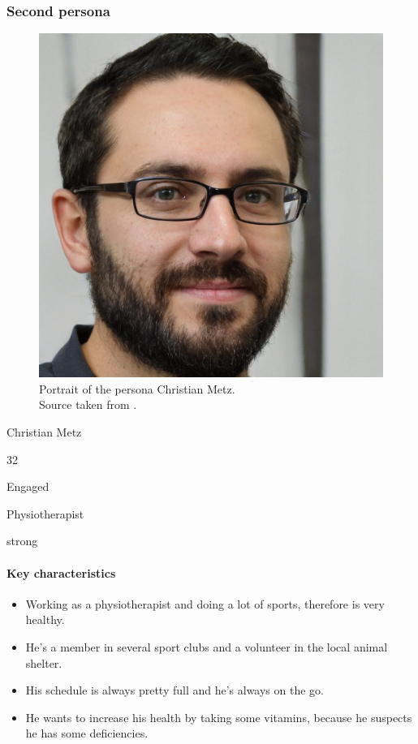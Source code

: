 \documentclass[conference]{IEEEtran}
\begin{document}
\subsubsection{Second persona} \hfill
\begin{figure}[h]
	\centerline{\includegraphics[width=.5\linewidth]{images/persona02.jpg}}
	\caption[Portrait of the persona Christian Metz; Source taken from \cite{personaimg}.]
	{Portrait of the persona Christian Metz.\\ Source taken from \cite{personaimg}.\endtabular}
	\label{fig:persona2}
\end{figure}

\begin{description}[labelwidth=\widthof{\bfseries Computer skills},leftmargin=.8cm,labelindent=.8cm]
	\item[Name] Christian Metz
	\item[Age] 32
	\item[Marital status] Engaged
	\item[Occupation] Physiotherapist
	\item[Computer skills] strong
\end{description}

\paragraph*{Key characteristics}
\begin{itemize}[leftmargin=1.25cm]
	\item Working as a physiotherapist and doing a lot of sports, therefore is very healthy.
	\item He's a member in several sport clubs and a volunteer in the local animal shelter.
	\item His schedule is always pretty full and he's always on the go.
	\item He wants to increase his health by taking some vitamins, because he suspects he has some deficiencies.
\end{itemize}
\end{document}
